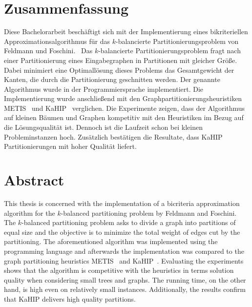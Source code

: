 \chapter{Zusammenfassung}
Diese Bachelorarbeit beschäftigt sich mit der Implementierung eines bikriteriellen Approximationsalgorithmus für das $k$\hyp balancierte Partitionierungsproblem von Feldmann und Foschini.~\cite{FF15}
Das $k$\hyp balancierte Partitionierungsproblem fragt nach einer Partitionierung eines Eingabegraphen in Partitionen mit gleicher Größe.
Dabei minimiert eine Optimallösung dieses Problems das Gesamtgewicht der Kanten, die durch die Partitionierung geschnitten werden.
Der genannte Algorithmus wurde in der Programmiersprache \Cpp{} implementiert.
Die Implementierung wurde anschließend mit den Graphpartitionierungsheuristiken METIS~\cite{KK98} und KaHIP~\cite{SS13} verglichen.
Die Experimente zeigen, dass der Algorithmus auf kleinen Bäumen und Graphen kompetitiv mit den Heuristiken im Bezug auf die Lösungsqualität ist.
Dennoch ist die Laufzeit schon bei kleinen Probleminstanzen hoch.
Zusätzlich bestätigen die Resultate, dass KaHIP Partitionierungen mit hoher Qualität liefert.

{\let\cleardoublepage\relax \chapter{Abstract}}
This thesis is concerned with the implementation of a bicriteria approximation algorithm for the $k$\hyp balanced partitioning problem by Feldmann and Foschini.~\cite{FF15}
The $k$\hyp balanced partitioning problem asks to divide a graph into partitions of equal size and the objective is to minimize the total weight of edges cut by the partitioning.
The aforementioned algorithm was implemented using the programming language \Cpp{} and afterwards the implementation was compared to the graph partitioning heuristics METIS~\cite{KK98} and KaHIP~\cite{SS13}.
Evaluating the experiments shows that the algorithm is competitive with the heuristics in terms solution quality when considering small trees and graphs.
The running time, on the other hand, is high even on relatively small instances.
Additionally, the results confirm that KaHIP delivers high quality partitions.
